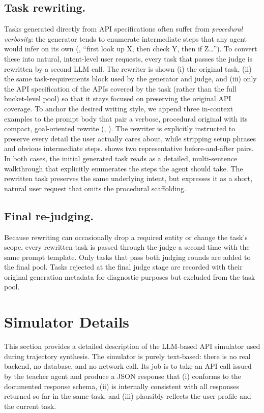 \subsection{Task rewriting.}
\label{sec:task_rewriting}
Tasks generated directly from API specifications often suffer from \emph{procedural verbosity}: the generator tends to enumerate intermediate steps that any agent would infer on its own (\eg, ``first look up X, then check Y, then if Z\dots''). To convert these into
natural, intent-level user requests, every task that passes the judge is rewritten by a second LLM call. The rewriter is shown (i) the original task, (ii) the same task-requirements block used by the generator and judge, and (iii) only the API specification of the APIs
covered by the task (rather than the full bucket-level pool) so that it stays focused on preserving the original API coverage. To anchor the desired writing style, we append three in-context examples to the prompt body that pair a verbose, procedural original with its
compact, goal-oriented rewrite (, ). The rewriter is explicitly instructed to preserve every detail the user actually cares about, while stripping setup phrases and obvious intermediate steps.  shows two representative before-and-after pairs. In both cases, the initial generated task reads as a detailed, multi-sentence walkthrough that explicitly enumerates the steps the agent should take. The rewritten task preserves the same underlying intent, but expresses it as a short, natural user request that omits the procedural scaffolding.

\subsection{Final re-judging.}
Because rewriting can occasionally drop a required entity or change the task's scope, every rewritten task is passed through the judge a second time with the same prompt template. Only tasks that pass both judging rounds are added to the final pool. Tasks
rejected at the final judge stage are recorded with their original generation metadata for diagnostic purposes but excluded from the task pool.



\FloatBarrier






\section{Simulator Details}
\label{app:simulator}
This section provides a detailed description of the LLM-based API simulator used during trajectory synthesis. The simulator is purely text-based: there is no real backend, no database, and no network call. Its job is to take an API call issued by the teacher agent and
produce a JSON response that (i) conforms to the documented response schema, (ii) is internally consistent with all responses returned so far in the same task, and (iii) plausibly reflects the user profile and the current task.


